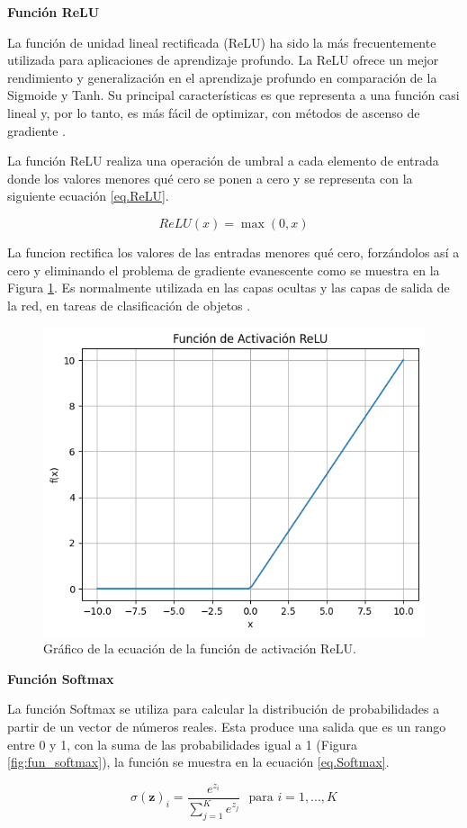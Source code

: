 \textbf{Función ReLU}

La función de unidad lineal rectificada (ReLU) ha sido la más frecuentemente utilizada para aplicaciones de aprendizaje profundo. La ReLU ofrece un mejor rendimiento y generalización en el aprendizaje profundo en comparación de la Sigmoide y Tanh. Su principal características es que representa a una función casi lineal y, por lo tanto, es más fácil de optimizar, con métodos de ascenso de gradiente \citep{nair2010rectified}.

La función ReLU realiza una operación de umbral a cada elemento de entrada donde los valores menores qué cero se ponen a cero y se representa con la siguiente ecuación \ref{eq.ReLU}.

\begin{equation}
    ReLU(x) = \max(0, x)
    \label{eq.ReLU}
\end{equation}

La funcion rectifica los valores de las entradas menores qué cero, forzándolos así a cero y eliminando el problema de gradiente evanescente como se muestra en la Figura \ref{fig:fun_relu}. Es normalmente utilizada en las capas ocultas y las capas de salida de la red, en tareas de clasificación de objetos \citep{krizhevsky2012imagenet}.

\begin{figure}[!h]
    \centering
    \includegraphics[width=.4\textwidth]{Imagenes/Fun_ReLU.png}
    \caption{Gráfico de la ecuación de la función de activación ReLU.}
    \label{fig:fun_relu}
\end{figure}

\textbf{Función Softmax}

La función Softmax se utiliza para calcular la distribución de probabilidades a partir de un vector de números reales. Esta produce una salida que es un rango entre 0 y 1, con la suma de las probabilidades igual a 1 (Figura \ref{fig:fun_softmax}), la función se muestra en la ecuación \ref{eq.Softmax}.

\begin{equation}
    \sigma(\mathbf{z})_i = \frac{e^{z_i}}{\sum_{j=1}^K e^{z_j}} \ \ \  \text{para } i = 1, ..., K
    \label{eq.Softmax}
\end{equation}

